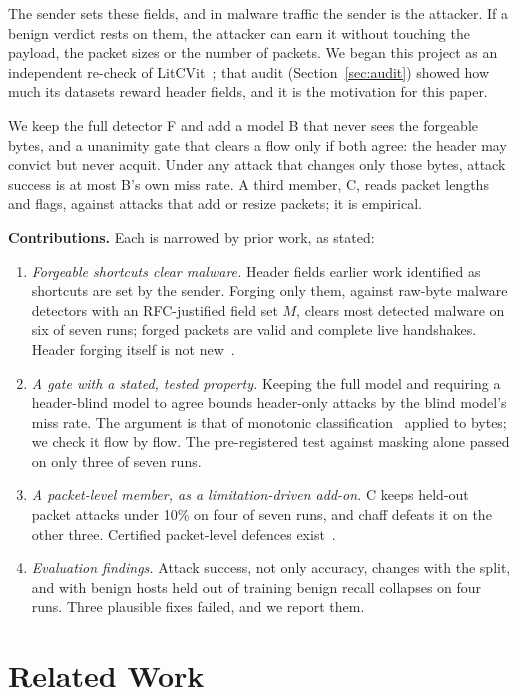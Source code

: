 \documentclass[journal]{IEEEtran}
\begin{document}
The sender sets these fields, and in malware traffic the sender is the attacker. If a benign verdict rests on them, the attacker can earn it without touching the payload, the packet sizes or the number of packets. We began this project as an independent re-check of LitCVit~\cite{nisa2026litcvit}; that audit (Section~\ref{sec:audit}) showed how much its datasets reward header fields, and it is the motivation for this paper.

We keep the full detector F and add a model B that never sees the forgeable bytes, and a unanimity gate that clears a flow only if both agree: the header may convict but never acquit. Under any attack that changes only those bytes, attack success is at most B's own miss rate. A third member, C, reads packet lengths and flags, against attacks that add or resize packets; it is empirical.

\textbf{Contributions.} Each is narrowed by prior work, as stated:
\begin{enumerate}
\item \emph{Forgeable shortcuts clear malware.} Header fields earlier work identified as shortcuts are set by the sender. Forging only them, against raw-byte malware detectors with an RFC-justified field set $M$, clears most detected malware on six of seven runs; forged packets are valid and complete live handshakes. Header forging itself is not new~\cite{ling2026flowpaint,prepadding2025}.
\item \emph{A gate with a stated, tested property.} Keeping the full model and requiring a header-blind model to agree bounds header-only attacks by the blind model's miss rate. The argument is that of monotonic classification~\cite{incer2018monotonic} applied to bytes; we check it flow by flow. The pre-registered test against masking alone passed on only three of seven runs.
\item \emph{A packet-level member, as a limitation-driven add-on.} C keeps held-out packet attacks under 10\% on four of seven runs, and chaff defeats it on the other three. Certified packet-level defences exist~\cite{yan2025certta}.
\item \emph{Evaluation findings.} Attack success, not only accuracy, changes with the split, and with benign hosts held out of training benign recall collapses on four runs. Three plausible fixes failed, and we report them.
\end{enumerate}

\section{Related Work}
\label{sec:related}
\end{document}
